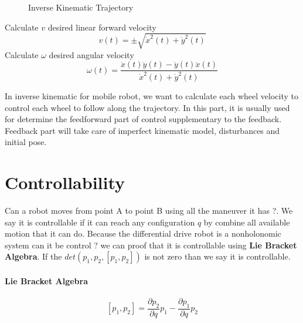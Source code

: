 \begin{figure}[h]
	\centering
	
	\caption{Inverse Kinematic Trajectory}
\end{figure}

\begin{tcolorbox}[title=Reference Trajectory Velocity]
	Calculate $v$ desired linear forward velocity
	\begin{equation}
		v(t) = \pm \sqrt{\dot{x}^2(t) + \dot{y}^2(t)}
	\end{equation}
	Calculate $\omega$ desired angular velocity
	\begin{equation}
		\omega(t) = \frac{\dot{x}(t)\ddot{y}(t) - \dot{y}(t)\ddot{x}(t)}{\dot{x}^2(t) + \dot{y}^2(t)}
	\end{equation}
\end{tcolorbox}

In inverse kinematic for mobile robot, we want to calculate each wheel velocity to control each wheel to follow along the trajectory. In this part, it is usually used for determine the feedforward part of control supplementary to the feedback. Feedback part will take care of imperfect kinematic model, disturbances and initial pose.

\section{Controllability}
Can a robot moves from point A to point B using all the maneuver it has ?. We say it is controllable if it can reach any configuration $q$ by combine all available motion that it can do. Because the differential drive robot is a nonholonomic system can it be control ? we can proof that it is controllable using \textbf{Lie Bracket Algebra}. If the $det(p_1,p_2,[p_1,p_2])$ is not zero than we say it is controllable.
\paragraph{Lie Bracket Algebra}
\[
[p_1,p_2] = \frac{\partial p_2}{\partial q}p_1 -\frac{\partial p_1}{\partial q}p_2
\]
